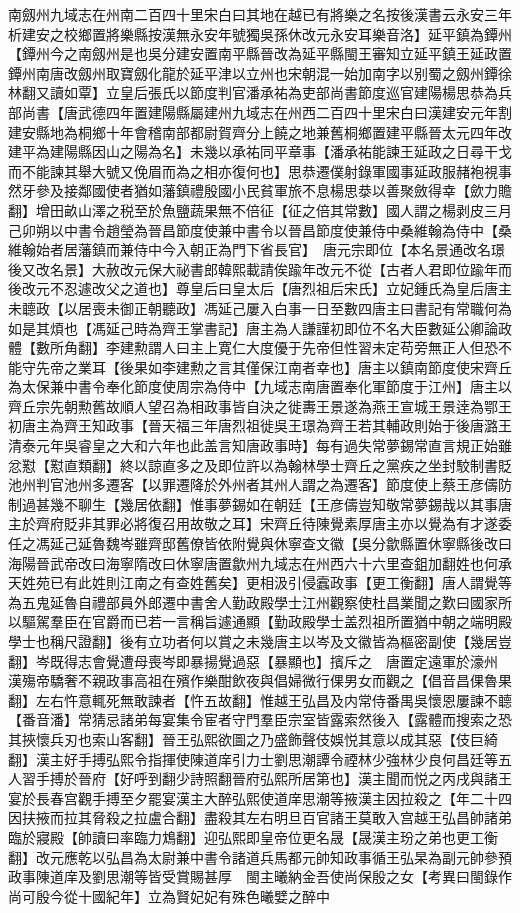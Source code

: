 南劔州九域志在州南二百四十里宋白曰其地在越已有將樂之名按後漢書云永安三年析建安之校鄉置將樂縣按漢無永安年號獨吳孫休改元永安耳樂音洛】延平鎮為鐔州【鐔州今之南劔州是也吳分建安置南平縣晉改為延平縣閩王審知立延平鎮王延政置鐔州南唐改劔州取寶劔化龍於延平津以立州也宋朝混一始加南字以别蜀之劔州鐔徐林翻又讀如覃】立皇后張氏以節度判官潘承祐為吏部尚書節度巡官建陽楊思恭為兵部尚書【唐武德四年置建陽縣屬建州九域志在州西二百四十里宋白曰漢建安元年割建安縣地為桐鄉十年會稽南部都尉賀齊分上饒之地兼舊桐鄉置建平縣晉太元四年改建平為建陽縣因山之陽為名】未幾以承祐同平章事【潘承祐能諫王延政之日尋干戈而不能諫其舉大號又俛眉而為之相亦復何也】思恭遷僕射錄軍國事延政服赭袍視事然牙參及接鄰國使者猶如藩鎮禮殷國小民貧軍旅不息楊思㳟以善聚斂得幸【歛力贍翻】增田畝山澤之税至於魚鹽蔬果無不倍征【征之倍其常數】國人謂之楊剥皮三月己卯朔以中書令趙瑩為晉昌節度使兼中書令以晉昌節度使兼侍中桑維翰為侍中【桑維翰始者居藩鎮而兼侍中今入朝正為門下省長官】　唐元宗即位【本名景通改名璟後又改名景】大赦改元保大祕書郎韓熙載請俟踰年改元不從【古者人君即位踰年而後改元不忍遽改父之道也】尊皇后曰皇太后【唐烈祖后宋氏】立妃鍾氏為皇后唐主未聼政【以居喪未御正朝聽政】馮延己屢入白事一日至數四唐主曰書記有常職何為如是其煩也【馮延己時為齊王掌書記】唐主為人謙謹初即位不名大臣數延公卿論政體【數所角翻】李建勲謂人曰主上寛仁大度優于先帝但性習未定苟旁無正人但恐不能守先帝之業耳【後果如李建勲之言其僅保江南者幸也】唐主以鎮南節度使宋齊丘為太保兼中書令奉化節度使周宗為侍中【九域志南唐置奉化軍節度于江州】唐主以齊丘宗先朝勲舊故順人望召為相政事皆自決之徙夀王景遂為燕王宣城王景逹為鄂王初唐主為齊王知政事【晉天福三年唐烈祖徙吳王璟為齊王若其輔政則始于後唐潞王清泰元年吳睿皇之大和六年也此盖言知唐政事時】每有過失常夢錫常直言規正始雖忿懟【懟直類翻】終以諒直多之及即位許以為翰林學士齊丘之黨疾之坐封駮制書貶池州判官池州多遷客【以罪遷降於外州者其州人謂之為遷客】節度使上蔡王彦儔防制過甚幾不聊生【幾居依翻】惟事夢錫如在朝廷【王彦儔豈知敬常夢錫哉以其事唐主於齊府貶非其罪必將復召用故敬之耳】宋齊丘待陳覺素厚唐主亦以覺為有才遂委任之馮延己延魯魏岑雖齊邸舊僚皆依附覺與休寧查文徽【吳分歙縣置休寧縣後改曰海陽晉武帝改曰海寧隋改曰休寧唐置歙州九域志在州西六十六里查鉏加翻姓也何承天姓苑已有此姓則江南之有查姓舊矣】更相汲引侵蠧政事【更工衡翻】唐人謂覺等為五鬼延魯自禮部員外郎遷中書舍人勤政殿學士江州觀察使杜昌業聞之歎曰國家所以驅駕羣臣在官爵而已若一言稱旨遽通顯【勤政殿學士盖烈祖所置猶中朝之端明殿學士也稱尺證翻】後有立功者何以賞之未幾唐主以岑及文徽皆為樞密副使【幾居豈翻】岑既得志會覺遭母喪岑即暴揚覺過惡【暴顯也】擯斥之　唐置定遠軍於濠州　漢殤帝驕奢不親政事高祖在殯作樂酣飲夜與倡婦微行倮男女而觀之【倡音昌倮魯果翻】左右忤意輒死無敢諫者【忤五故翻】惟越王弘昌及内常侍番禺吳懷恩屢諫不聼【番音潘】常猜忌諸弟每宴集令宦者守門羣臣宗室皆露索然後入【露體而搜索之恐其挾懷兵刃也索山客翻】晉王弘熙欲圖之乃盛飾聲伎娛悦其意以成其惡【伎巨綺翻】漢主好手搏弘熙令指揮使陳道庠引力士劉思潮譚令禋林少強林少良何昌廷等五人習手搏於晉府【好呼到翻少詩照翻晉府弘熙所居第也】漢主聞而悦之丙戌與諸王宴於長春宫觀手搏至夕罷宴漢主大醉弘熙使道庠思潮等掖漢主因拉殺之【年二十四因扶掖而拉其脅殺之拉盧合翻】盡殺其左右明旦百官諸王莫敢入宫越王弘昌帥諸弟臨於寢殿【帥讀曰率臨力鴆翻】迎弘熙即皇帝位更名晟【晟漢主玢之弟也更工衡翻】改元應乾以弘昌為太尉兼中書令諸道兵馬都元帥知政事循王弘杲為副元帥參預政事陳道庠及劉思潮等皆受賞賜甚厚　閩主曦納金吾使尚保殷之女【考異曰閩錄作尚可殷今從十國紀年】立為賢妃妃有殊色曦嬖之醉中

